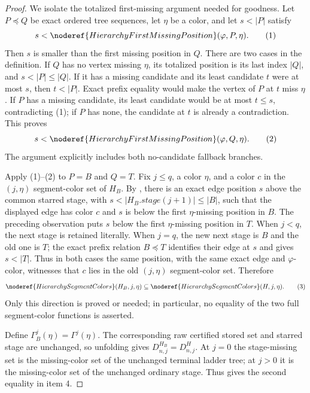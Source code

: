 \begin{proof}
We isolate the totalized first-missing argument needed for goodness.
Let $P\preccurlyeq Q$ be exact ordered tree sequences, let $\eta$ be a
color, and let $s<|P|$ satisfy
\[
 s<\noderef{HierarchyFirstMissingPosition}(\varphi,P,\eta).
                                                               \tag{1}
\]
Then $s$ is smaller than the first missing position in $Q$.  There are
two cases in the definition.  If $Q$ has no vertex missing $\eta$, its
totalized position is its last index $|Q|$, and $s<|P|\leq|Q|$.  If it
has a missing candidate and its least candidate $t$ were at most $s$,
then $t<|P|$.  Exact prefix equality would make the vertex of $P$ at
$t$ miss $\eta$.  If $P$ has a missing candidate, its least candidate
would be at most $t\leq s$, contradicting (1); if $P$ has none, the
candidate at $t$ is already a contradiction.  This proves
\[
 s<\noderef{HierarchyFirstMissingPosition}(\varphi,Q,\eta).   \tag{2}
\]
The argument explicitly includes both no-candidate fallback branches.

Apply (1)--(2) to $P=B$ and $Q=T$.  Fix $j\leq q$, a color $\eta$,
and a color $c$ in the $(j,\eta)$ segment-color set of $H_B$.  By
, there is an exact edge position $s$
above the common starred stage, with
$s<|H_B.\mathit{stage}(j+1)|\leq|B|$, such that the displayed edge has
color $c$ and $s$ is below the first $\eta$-missing position in $B$.
The preceding observation puts $s$ below the first $\eta$-missing
position in $T$.  When $j<q$, the next stage is retained literally.
When $j=q$, the new next stage is $B$ and the old one is $T$; the exact
prefix relation $B\preccurlyeq T$ identifies their edge at $s$ and gives
$s<|T|$.  Thus in both cases the same position, with the same exact edge
and $\varphi$-color, witnesses that $c$ lies in the old $(j,\eta)$
segment-color set.  Therefore
\[
 \noderef{HierarchySegmentColors}(H_B,j,\eta)
 \subseteq\noderef{HierarchySegmentColors}(H,j,\eta).         \tag{3}
\]
Only this direction is proved or needed; in particular, no equality of
the two full segment-color functions is asserted.

Define $\Gamma_B^j(\eta)=\Gamma^j(\eta)$.  The corresponding raw
certified stored set and starred stage are unchanged, so unfolding
 gives
$D^{H_B}_{n,j}=D^H_{n,j}$.  At $j=0$ the stage-missing set is the
missing-color set of the unchanged terminal ladder tree; at $j>0$ it is
the missing-color set of the unchanged ordinary stage.  Thus
 gives the second equality in
item 4.


\end{proof}
